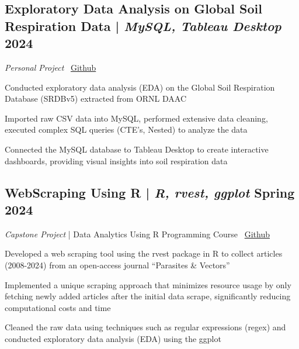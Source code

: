 \subsection{Exploratory Data Analysis on Global Soil Respiration Data \textnormal{ | \textit{MySQL, Tableau Desktop} \hfill 2024}}
\textit{Personal Project} \hfill \faCodeFork\ \href{https://github.com/vinay-ram1999/SRDBv5-Analytics}{Github}
\begin{zitemize}
    \item Conducted exploratory data analysis (EDA) on the Global Soil Respiration Database (SRDBv5) extracted from ORNL DAAC
    \item Imported raw CSV data into MySQL, performed extensive data cleaning, executed complex SQL queries (CTE's, Nested) to analyze the data
    \item Connected the MySQL database to Tableau Desktop to create interactive dashboards, providing visual insights into soil respiration data
\end{zitemize}


\subsection{WebScraping Using R \textnormal{ | \textit{R, rvest, ggplot} \hfill Spring 2024}}
\textit{Capstone Project} | Data Analytics Using R Programming Course \hfill \faCodeFork\ \href{https://github.com/vinay-ram1999/WebScraping-R}{Github}
\begin{zitemize}
    \item Developed a web scraping tool using the rvest package in R to collect articles (2008-2024) from an open-access journal ``Parasites \& Vectors''
    \item Implemented a unique scraping approach that minimizes resource usage by only fetching newly added articles after the initial data scrape, significantly reducing computational costs and time
    \item Cleaned the raw data using techniques such as regular expressions (regex) and conducted exploratory data analysis (EDA) using the ggplot
\end{zitemize}



